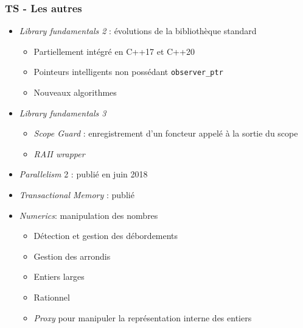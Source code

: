 \documentclass[C++.tex]{subfiles}
\begin{document}
\begin{frame}[fragile]
	\frametitle{TS - Les autres}
	\begin{itemize}
		\item \textit{Library fundamentals 2} : évolutions de la bibliothèque standard
		\begin{itemize}
			\item Partiellement intégré en C++17 et C++20
			\item Pointeurs intelligents non possédant \lstinline|observer_ptr|
			\item Nouveaux algorithmes
		\end{itemize}
		\item \textit{Library fundamentals 3}
		\begin{itemize}
			\item \textit{Scope Guard} : enregistrement d'un foncteur appelé à la sortie du scope
			\item \textit{RAII wrapper}
		\end{itemize}
		\item \textit{Parallelism} 2 : publié en juin 2018
		\item \textit{Transactional Memory} : publié
		\item \textit{Numerics}: manipulation des nombres
		\begin{itemize}
			\item Détection et gestion des débordements
			\item Gestion des arrondis
			\item Entiers larges
			\item Rationnel
			\item \textit{Proxy} pour manipuler la représentation interne des entiers
		\end{itemize}
	\end{itemize}
\end{frame}
\end{document}
